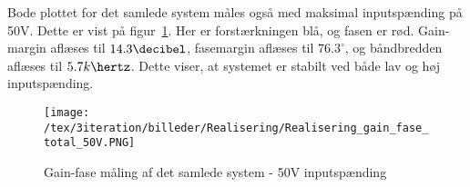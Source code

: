 Bode plottet for det samlede system måles også med maksimal inputspænding på 50V. Dette er vist på figur~\ref{fig:Realisering_total_50V_3}. Her er forstærkningen blå, og fasen er rød. Gain-margin aflæses til $14.3\decibel$, fasemargin aflæses til $76.3^\circ$, og båndbredden aflæses til $5.7k\hertz$. Dette viser, at systemet er stabilt ved både lav og høj inputspænding.

\begin{figure}[H]
	\center
	\texttt{[image: /tex/3iteration/billeder/Realisering/Realisering\_gain\_fase\_total\_50V.PNG]}
	\caption{Gain-fase måling af det samlede system - 50V inputspænding}
	\label{fig:Realisering_total_50V_3}
\end{figure}





